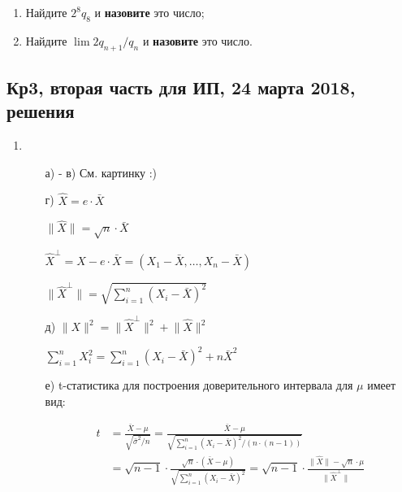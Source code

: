         \begin{enumerate}[label=\asbuk*)]
	  \item Найдите $2^8q_8$ и \textbf{назовите} это число;
          \item Найдите $\lim 2q_{n+1}/q_n$ и \textbf{назовите} это число.
	\end{enumerate}



\subsection{Кр3, вторая часть для ИП, 24 марта 2018, решения}

\begin{enumerate}
\item
\begin{enumerate}
	\item[а) - в)] См. картинку :)
\begin{figure}[h!]
\centering
{}
\end{figure}
\item[г)] $\hat{X}=e\cdot\bar{X}$

$\lVert \hat{X} \rVert=\sqrt{n}\cdot\bar{X}$

$\hat{X}^{\perp}=X-e\cdot\bar{X}=(X_1-\bar{X}, \dots ,X_n-\bar{X})$

$\lVert\hat{X}^{\perp} \rVert =\sqrt{\sum^n_{i=1}(X_i-\bar{X})^2}$

\item[д)] $ \lVert X \rVert^2=\lVert\hat{X}^{\perp}\rVert^2+\lVert\hat{X}\rVert^2$

$\sum^n_{i=1}X^2_i=\sum^n_{i=1}(X_i-\bar{X})^2+n\bar{X}^2$

\item[е)] t-статистика для построения доверительного интервала для $\mu$ имеет вид:

\begin{align*}
t &= \frac{\bar{X}-\mu}{\sqrt{\bar{\sigma}^2/n}} = \frac{\bar{X}-\mu}{\sqrt{\sum^n_{i=1}(X_i-\bar{X})^2/(n\cdot(n-1))}}\\
& =\sqrt{n-1}\cdot\frac{\sqrt{n}\cdot(\bar{X}-\mu)}{\sqrt{\sum^n_{i=1}(X_i-\bar{X})^2}}=\sqrt{n-1}\cdot\frac{\lVert \hat{X} \rVert-\sqrt{n}\cdot\mu}{\lVert\hat{X}^{\perp} \rVert}
\end{align*}


\end{enumerate}
\end{enumerate}
